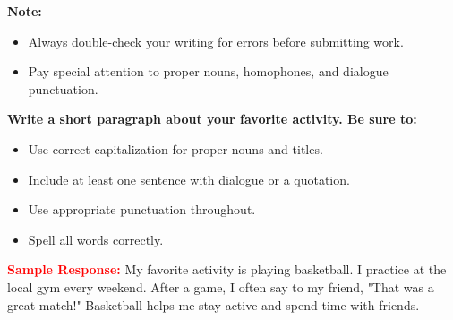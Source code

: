 \documentclass[12pt]{article}
\begin{document}
\vspace{1em}

\begin{tcolorbox}[colframe=black!40, colback=gray!5, 
coltitle=black, colbacktitle=black!20, fonttitle=\bfseries\Large, 
title=Additional Notes, halign title=center, left=5pt, right=5pt, top=5pt, bottom=15pt]
\textbf{Note:}
\begin{itemize}
    \item Always double-check your writing for errors before submitting work.
    \item Pay special attention to proper nouns, homophones, and dialogue punctuation.
\end{itemize}
\end{tcolorbox}

\vspace{1em}

\begin{tcolorbox}[colframe=black!60, colback=white, 
coltitle=black, colbacktitle=black!15, fonttitle=\bfseries\Large, 
title=Exit Ticket, halign title=center, left=10pt, right=10pt, top=5pt, bottom=15pt]

\textbf{Write a short paragraph about your favorite activity. Be sure to:}
\begin{itemize}
    \item Use correct capitalization for proper nouns and titles.
    \item Include at least one sentence with dialogue or a quotation.
    \item Use appropriate punctuation throughout.
    \item Spell all words correctly.
\end{itemize}

\textcolor{red}{\textbf{Sample Response:}} My favorite activity is playing basketball. I practice at the local gym every weekend. After a game, I often say to my friend, "That was a great match!" Basketball helps me stay active and spend time with friends.

\vspace{8em}

\end{tcolorbox}
\end{document}
